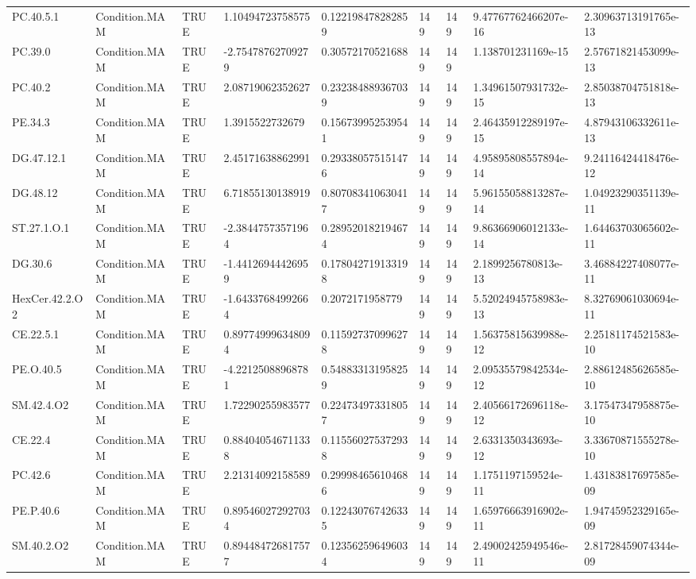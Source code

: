 \begin{longtable}{lllllllll}
PC.40.5.1 & Condition.MAM & TRUE & 1.10494723758575 & 0.122198478282859 & 149 & 149 & 9.47767762466207e-16 & 2.30963713191765e-13 \\
PC.39.0 & Condition.MAM & TRUE & -2.75478762709279 & 0.30572170521688 & 149 & 149 & 1.138701231169e-15 & 2.57671821453099e-13 \\
PC.40.2 & Condition.MAM & TRUE & 2.08719062352627 & 0.232384889367039 & 149 & 149 & 1.34961507931732e-15 & 2.85038704751818e-13 \\
PE.34.3 & Condition.MAM & TRUE & 1.3915522732679 & 0.156739952539541 & 149 & 149 & 2.46435912289197e-15 & 4.87943106332611e-13 \\
DG.47.12.1 & Condition.MAM & TRUE & 2.45171638862991 & 0.293380575151476 & 149 & 149 & 4.95895808557894e-14 & 9.24116424418476e-12 \\
DG.48.12 & Condition.MAM & TRUE & 6.71855130138919 & 0.807083410630417 & 149 & 149 & 5.96155058813287e-14 & 1.04923290351139e-11 \\
ST.27.1.O.1 & Condition.MAM & TRUE & -2.38447573571964 & 0.289520182194674 & 149 & 149 & 9.86366906012133e-14 & 1.64463703065602e-11 \\
DG.30.6 & Condition.MAM & TRUE & -1.44126944426959 & 0.178042719133198 & 149 & 149 & 2.1899256780813e-13 & 3.46884227408077e-11 \\
HexCer.42.2.O2 & Condition.MAM & TRUE & -1.64337684992664 & 0.2072171958779 & 149 & 149 & 5.52024945758983e-13 & 8.32769061030694e-11 \\
CE.22.5.1 & Condition.MAM & TRUE & 0.897749996348094 & 0.115927370996278 & 149 & 149 & 1.56375815639988e-12 & 2.25181174521583e-10 \\
PE.O.40.5 & Condition.MAM & TRUE & -4.22125088968781 & 0.548833131958259 & 149 & 149 & 2.09535579842534e-12 & 2.88612485626585e-10 \\
SM.42.4.O2 & Condition.MAM & TRUE & 1.72290255983577 & 0.224734973318057 & 149 & 149 & 2.40566172696118e-12 & 3.17547347958875e-10 \\
CE.22.4 & Condition.MAM & TRUE & 0.884040546711338 & 0.115560275372938 & 149 & 149 & 2.6331350343693e-12 & 3.33670871555278e-10 \\
PC.42.6 & Condition.MAM & TRUE & 2.21314092158589 & 0.299984656104686 & 149 & 149 & 1.1751197159524e-11 & 1.43183817697585e-09 \\
PE.P.40.6 & Condition.MAM & TRUE & 0.895460272927034 & 0.122430767426335 & 149 & 149 & 1.65976663916902e-11 & 1.94745952329165e-09 \\
SM.40.2.O2 & Condition.MAM & TRUE & 0.894484726817577 & 0.123562596496034 & 149 & 149 & 2.49002425949546e-11 & 2.81728459074344e-09 \\

\end{longtable}
